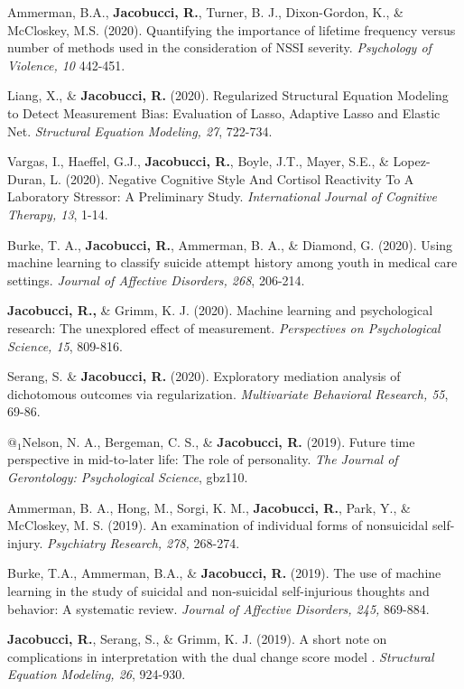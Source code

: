 \documentclass[letterpaper,10pt]{article}
\begin{document}
\begin{etaremune}
	\item  Ammerman, B.A., \textbf{Jacobucci, R.}, Turner, B. J., Dixon-Gordon, K., \& McCloskey, M.S. (2020). Quantifying the importance of lifetime frequency versus number of methods used in the consideration of NSSI severity. \emph{Psychology of Violence, 10} 442-451.
	\item Liang, X., \& \textbf{Jacobucci, R.} (2020). Regularized Structural Equation Modeling to Detect Measurement Bias: Evaluation of Lasso, Adaptive Lasso and Elastic Net. \emph{Structural Equation Modeling, 27}, 722-734.
	\item Vargas, I., Haeffel, G.J., \textbf{Jacobucci, R.}, Boyle, J.T., Mayer, S.E., \& Lopez-Duran, L. (2020). Negative Cognitive Style And Cortisol Reactivity To A Laboratory Stressor: A Preliminary Study. \emph{International Journal of Cognitive Therapy, 13}, 1-14. 
	\item Burke, T. A., \textbf{Jacobucci, R.}, Ammerman, B. A., \& Diamond, G. (2020). Using machine learning to classify suicide attempt history among youth in medical care settings. \emph{Journal of Affective Disorders, 268}, 206-214.
	\item  \textbf{Jacobucci, R.,} \& Grimm, K. J. (2020). Machine learning and psychological research: The unexplored effect of measurement. \emph{Perspectives on Psychological Science, 15}, 809-816.
	\item Serang, S. \& \textbf{Jacobucci, R.} (2020). Exploratory mediation analysis of dichotomous outcomes via regularization. \emph{Multivariate Behavioral Research, 55}, 69-86.
	\item  $@_1$Nelson, N. A., Bergeman, C. S., \& \textbf{Jacobucci, R.} (2019). Future time perspective in mid-to-later life: The role of personality. \emph{The Journal of Gerontology: Psychological Science}, gbz110.
	\item  Ammerman, B. A., Hong, M., Sorgi, K. M., \textbf{Jacobucci, R.}, Park, Y., \& McCloskey, M. S. (2019). An examination of individual forms of nonsuicidal self-injury. \emph{Psychiatry Research, 278,} 268-274.
	\item  Burke, T.A., Ammerman, B.A., \& \textbf{Jacobucci, R.} (2019). The use of machine learning in the study of suicidal and non-suicidal self-injurious thoughts and behavior: A systematic review. \emph{Journal of Affective Disorders, 245,} 869-884.
	\item  \textbf{Jacobucci, R.}, Serang, S., \& Grimm, K. J. (2019). A short note on complications in interpretation with the dual change score model . \emph{Structural Equation Modeling, 26}, 924-930.

\end{etaremune}
\end{document}
